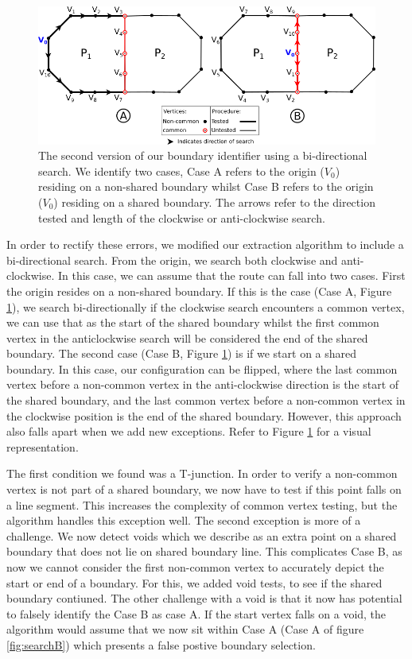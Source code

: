 \begin{figure}[t]
\includegraphics[width=1\textwidth]{images/ch6/caseA}
\caption{The second version of our boundary identifier using a bi-directional search. We identify two cases, Case A refers to the origin ($V_0$) residing on a non-shared boundary whilst Case B refers to the origin ($V_0$) residing on a shared boundary. The arrows refer to the direction tested and length of the clockwise or anti-clockwise search.} \label{fig:searchA}
\end{figure}

In order to rectify these errors, we modified our extraction algorithm to include a bi-directional search. From the origin, we search both clockwise and anti-clockwise. In this case, we can assume that the route can fall into two cases. First the origin resides on a non-shared boundary. If this is the case (Case A, Figure \ref{fig:searchA}), we search bi-directionally if the clockwise search encounters a common vertex, we can use that as the start of the shared boundary whilst the first common vertex in the anticlockwise search will be considered the end of the shared boundary. The second case (Case B, Figure \ref{fig:searchA}) is if we start on a shared boundary. In this case, our configuration can be flipped, where the last common vertex before a non-common vertex in the anti-clockwise direction is the start of the shared boundary, and the last common vertex before a non-common vertex in the clockwise position is the end of the shared boundary. However, this approach also falls apart when we add new exceptions. Refer to Figure \ref{fig:searchA} for a visual representation.


The first condition we found was a T-junction. In order to verify a non-common vertex is not part of a shared boundary, we now have to test if this point falls on a line segment. This increases the complexity of common vertex testing, but the algorithm handles this exception well. The second exception is more of a challenge. We now detect voids which we describe as an extra point on a shared boundary that does not lie on shared boundary line. This complicates Case B, as now we cannot consider the first non-common vertex to accurately depict the start or end of a boundary. For this, we added void tests, to see if the shared boundary contiuned. The other challenge with a void is that it now has potential to falsely identify the Case B as case A. If the start vertex falls on a void, the algorithm would assume that we now sit within Case A (Case A of figure \ref{fig:searchB}) which presents a false postive boundary selection.

